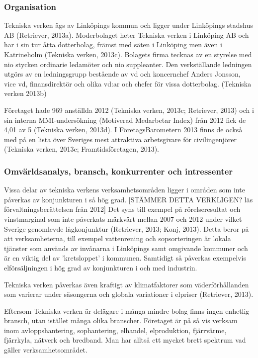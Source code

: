 \documentclass[10pt,a4paper]{article}
\begin{document}
\subsubsection{Organisation}
Tekniska verken ägs av Linköpings kommun och ligger under Linköpings stadshus AB (Retriever, 2013a). Moderbolaget heter Tekniska verken i Linköping AB och har i sin tur åtta dotterbolag, främst med säten i Linköping men även i Katrineholm (Tekniska verken, 2013c).  Bolagets firma tecknas av en styrelse med nio stycken ordinarie ledamöter och nio suppleanter. Den verkställande ledningen utgörs av en ledningsgrupp bestående av vd och koncernchef Anders Jonsson, vice vd, finansdirektör och olika vd:ar och chefer för vissa dotterbolag. (Tekniska verken 2013b)

Företaget hade 969 anställda 2012 (Tekniska verken, 2013c; Retriever, 2013) och i sin interna MMI-undersökning (Motiverad Medarbetar Index) från 2012 fick de 4,01 av 5 (Tekniska verken, 2013d). I FöretagsBarometern 2013 finns de också med på en lista över Sveriges mest attraktiva arbetsgivare för civilingenjörer (Tekniska verken, 2013e; Framtidsföretagen, 2013). 

\subsubsection{Omvärldsanalys, bransch, konkurrenter och intressenter}
Vissa delar av tekniska verkens verksamhetsområden ligger i områden som inte
påverkas av konjunkturen i så hög grad. [STÄMMER DETTA VERKLIGEN? läs förvaltningsberättelsen från 2012] 
Det syns till exempel på rörelseresultat och vinstmarginal som inte 
påverkats märkvärt mellan 2007 och 2012 under vilket Sverige genomlevde 
lågkonjunktur (Retriever, 2013; Konj, 2013). Detta beror på att verksamheterna, 
till exempel vattenrening och sopsorteringen är lokala tjänster som används av 
invånarna i Linköpings samt omgivande kommuner och är en viktig del av 'kretsloppet' i kommunen.
Samtidigt så påverkas exempelvis elförsäljningen i hög grad av konjunkturen i
och med industrin.

Tekniska verken påverkas även kraftigt av klimatfaktorer som väderförhållanden 
som varierar under säsongerna och globala variationer i elpriser (Retriever, 2013).

Eftersom Tekniska verken är delägare i många mindre bolag finns ingen enhetlig 
bransch, utan istället många olika branscher. Företaget är på så vis verksam inom
avloppshantering, sophantering, elhandel, elproduktion, fjärrvärme, fjärrkyla, 
nätverk och bredband. Man har alltså ett mycket brett spektrum vad gäller 
verksamhetsområdet. 
\end{document}
